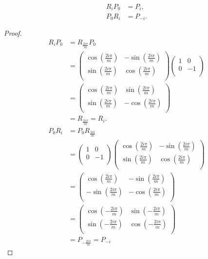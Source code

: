 \begin{lemma}
  \label{lem:i2m:rp=p:pr=p:}
  \begin{align*}
    R_iP_0&=P_i,\\
    P_0R_i &= P_{-i}.
  \end{align*}
\end{lemma}
\begin{proof}
  \begin{align*}
  R_iP_0&=R_{\frac{2i\pi}{m}}P_0\\
  &=
  \begin{pmatrix}
    \cos(\frac{2i\pi}{m}) & -\sin(\frac{2i\pi}{m})\\
    \sin(\frac{2i\pi}{m}) & \cos(\frac{2i\pi}{m})\\
  \end{pmatrix}
  \begin{pmatrix}
    1 & 0\\
    0 & -1\\
  \end{pmatrix}\\
  &=
  \begin{pmatrix}
    \cos(\frac{2i\pi}{m}) & \sin(\frac{2i\pi}{m})\\
    \sin(\frac{2i\pi}{m}) & -\cos(\frac{2i\pi}{m})\\
  \end{pmatrix}\\
  &=R_{\frac{2i\pi}{m}}=R_{i}.
  \end{align*}
  \begin{align*}
  P_0R_i &=P_0R_{\frac{2i\pi}{m}}\\
  &=
  \begin{pmatrix}
    1 & 0\\
    0 & -1\\
  \end{pmatrix}
  \begin{pmatrix}
    \cos(\frac{2i\pi}{m}) & -\sin(\frac{2i\pi}{m})\\
    \sin(\frac{2i\pi}{m}) & \cos(\frac{2i\pi}{m})\\
  \end{pmatrix}\\
  &=
  \begin{pmatrix}
    \cos(\frac{2i\pi}{m}) & -\sin(\frac{2i\pi}{m})\\
    -\sin(\frac{2i\pi}{m}) & -\cos(\frac{2i\pi}{m})\\
  \end{pmatrix}\\
  &=
  \begin{pmatrix}
    \cos(-\frac{2i\pi}{m}) & \sin(-\frac{2i\pi}{m})\\
    \sin(-\frac{2i\pi}{m}) & \cos(-\frac{2i\pi}{m})\\
  \end{pmatrix}\\
  &=
  P_{-\frac{2i\pi}{m}}=P_{-i}
  \end{align*}
\end{proof}

